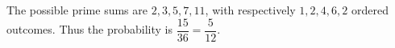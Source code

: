 The possible prime sums are $2,3,5,7,11$, with respectively $1,2,4,6,2$ ordered outcomes. Thus the probability is $\dfrac{15}{36}=\boxed{\dfrac{5}{12}}$.
